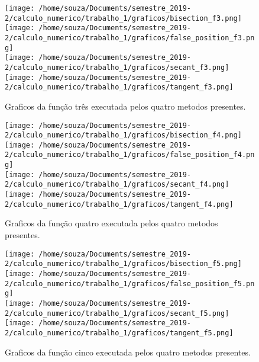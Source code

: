 \documentclass[12pt]{article}
\begin{document}
\begin{figure}[!h]
    \centering
    \texttt{[image: /home/souza/Documents/semestre\_2019-2/calculo\_numerico/trabalho\_1/graficos/bisection\_f3.png]}
    \texttt{[image: /home/souza/Documents/semestre\_2019-2/calculo\_numerico/trabalho\_1/graficos/false\_position\_f3.png]}\\
    \texttt{[image: /home/souza/Documents/semestre\_2019-2/calculo\_numerico/trabalho\_1/graficos/secant\_f3.png]}
    \texttt{[image: /home/souza/Documents/semestre\_2019-2/calculo\_numerico/trabalho\_1/graficos/tangent\_f3.png]}
    \caption{Graficos da função três executada pelos quatro metodos presentes.}
\end{figure}

\begin{figure}[!h]
    \centering
    \texttt{[image: /home/souza/Documents/semestre\_2019-2/calculo\_numerico/trabalho\_1/graficos/bisection\_f4.png]}
    \texttt{[image: /home/souza/Documents/semestre\_2019-2/calculo\_numerico/trabalho\_1/graficos/false\_position\_f4.png]}\\
    \texttt{[image: /home/souza/Documents/semestre\_2019-2/calculo\_numerico/trabalho\_1/graficos/secant\_f4.png]}
    \texttt{[image: /home/souza/Documents/semestre\_2019-2/calculo\_numerico/trabalho\_1/graficos/tangent\_f4.png]}
    \caption{Graficos da função quatro executada pelos quatro metodos presentes.}
\end{figure}

\begin{figure}[!h]
    \centering
    \texttt{[image: /home/souza/Documents/semestre\_2019-2/calculo\_numerico/trabalho\_1/graficos/bisection\_f5.png]}
    \texttt{[image: /home/souza/Documents/semestre\_2019-2/calculo\_numerico/trabalho\_1/graficos/false\_position\_f5.png]}\\
    \texttt{[image: /home/souza/Documents/semestre\_2019-2/calculo\_numerico/trabalho\_1/graficos/secant\_f5.png]}
    \texttt{[image: /home/souza/Documents/semestre\_2019-2/calculo\_numerico/trabalho\_1/graficos/tangent\_f5.png]}
    \caption{Graficos da função cinco executada pelos quatro metodos presentes.}
\end{figure}
\end{document}
